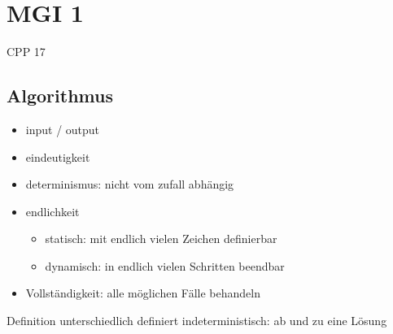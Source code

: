 \documentclass[12pt]{article}
\begin{document}
    \section*{MGI 1}
    CPP 17
    \subsection{Algorithmus}

    \begin{itemize}
        \item input / output
        \item eindeutigkeit
        \item determinismus: nicht vom zufall abhängig
        \item endlichkeit
        \begin{itemize}
            \item statisch: mit endlich vielen Zeichen definierbar
            \item dynamisch: in endlich vielen Schritten beendbar
        \end{itemize}
        \item Vollständigkeit: alle möglichen Fälle behandeln 
    \end{itemize}
    
    Definition
        unterschiedlich definiert
        indeterministisch: ab und zu eine Lösung
\end{document}
